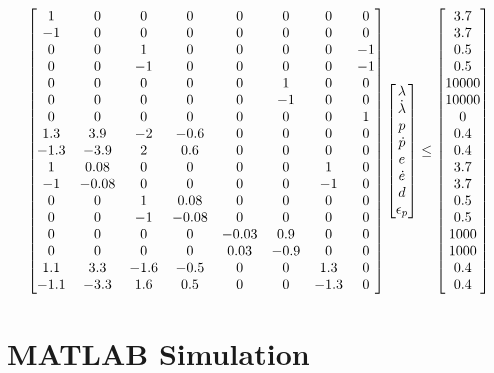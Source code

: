 \begin{equation}
    \begin{bmatrix}1 & 0 & 0 & 0 & 0 & 0 & 0 & 0 \\
       -1 & 0 & 0 & 0 & 0 & 0 & 0 & 0 \\
       0 & 0 & 1 & 0 & 0 & 0 & 0 & -1 \\
       0 & 0 & -1 & 0 & 0 & 0 & 0 & -1 \\
       0 & 0 & 0 & 0 & 0 & 1 & 0 & 0\\
       0 & 0 & 0 & 0 & 0 & -1 & 0 & 0 \\
       0 & 0 & 0 & 0 & 0 & 0 & 0 & 1 \\
       1.3 & 3.9 & -2 & -0.6 & 0 & 0 & 0 & 0 \\
       -1.3 & -3.9 & 2 & 0.6 & 0 & 0 & 0 & 0 \\
       1 & 0.08 & 0 & 0 & 0 & 0 & 1 & 0 \\
       -1 & -0.08 & 0 & 0 & 0 & 0 & -1 & 0 \\
       0 & 0 & 1 & 0.08 & 0 & 0 & 0 & 0 \\
       0 & 0 & -1 & -0.08 & 0 & 0 & 0 & 0 \\
       0 & 0 & 0 & 0 & -0.03 & 0.9 & 0 & 0 \\
       0 & 0 & 0 & 0 & 0.03 & -0.9 & 0 & 0 \\
       1.1 & 3.3 & -1.6 & -0.5 & 0 & 0 & 1.3 & 0 \\
       -1.1 & -3.3 & 1.6 & 0.5 & 0 & 0 & -1.3 & 0\end{bmatrix} \begin{bmatrix}\lambda \\ \dot \lambda \\ p \\ \dot p \\ e \\ \dot e \\ d \\ \epsilon_p\end{bmatrix} \leq \begin{bmatrix}3.7 \\ 3.7 \\ 0.5 \\ 0.5 \\ 10000 \\ 10000 \\ 0 \\ 0.4 \\ 0.4 \\ 3.7 \\ 3.7 \\ 0.5 \\ 0.5 \\ 1000 \\ 1000 \\ 0.4 \\ 0.4\end{bmatrix}
\end{equation}

\section{MATLAB Simulation}